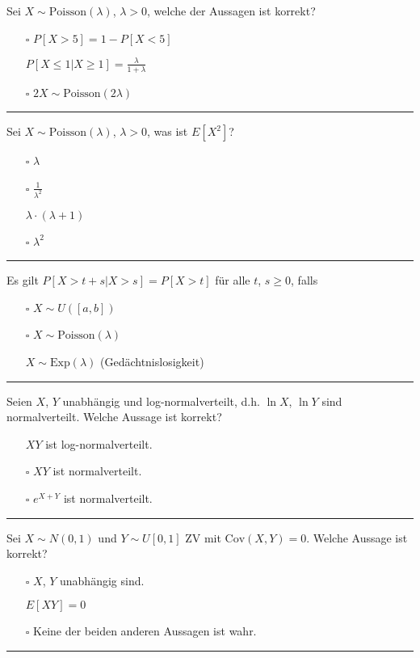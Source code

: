 Sei $X \sim \text{Poisson}(\lambda)$, $\lambda > 0$, welche der Aussagen ist korrekt?
\begin{itemize}
    \item[$\square$] $P[X > 5] = 1 - P[X < 5]$
    \item[\checkmark] $P[X \leq 1|X \geq 1] = \frac{\lambda}{1 + \lambda}$
    \item[$\square$] $2X \sim \text{Poisson}(2\lambda)$
\end{itemize}
\rule{\linewidth}{0.4pt}

Sei $X \sim \text{Poisson}(\lambda)$, $\lambda > 0$, was ist $E[X^2]$?
\begin{itemize}
    \item[$\square$] $\lambda$
    \item[$\square$] $\frac{1}{\lambda^2}$
    \item[\checkmark] $\lambda \cdot (\lambda + 1)$
    \item[$\square$] $\lambda^2$
\end{itemize}
\rule{\linewidth}{0.4pt}

Es gilt $P[X > t + s | X > s] = P[X > t]$ für alle $t$, $s \geq 0$, falls
\begin{itemize}
    \item[$\square$] $X \sim U([a, b])$
    \item[$\square$] $X \sim \text{Poisson}(\lambda)$
    \item[\checkmark] $X \sim \text{Exp}(\lambda)$ (Gedächtnislosigkeit)
\end{itemize}
\rule{\linewidth}{0.4pt}

Seien $X$, $Y$ unabhängig und log-normalverteilt, d.h. $\ln X$, $\ln Y$ sind normalverteilt. Welche Aussage ist korrekt?
\begin{itemize}
    \item[\checkmark] $XY$ ist log-normalverteilt.
    \item[$\square$] $XY$ ist normalverteilt.
    \item[$\square$] $e^{X+Y}$ ist normalverteilt.
\end{itemize}
\rule{\linewidth}{0.4pt}

Sei $X \sim N(0, 1)$ und $Y \sim U[0, 1]$ ZV mit $\text{Cov}(X, Y) = 0$. Welche Aussage ist korrekt?
\begin{itemize}
    \item[$\square$] $X$, $Y$ unabhängig sind.
    \item[\checkmark] $E[XY] = 0$
    \item[$\square$] Keine der beiden anderen Aussagen ist wahr.
\end{itemize}
\rule{\linewidth}{0.4pt}

